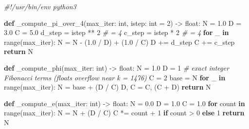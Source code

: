 \documentclass[
  11pt,
  letterpaper,
]{article}
\newenvironment{Shaded}{}{}
\newcommand{\BuiltInTok}[1]{\textcolor[rgb]{0.00,0.50,0.00}{#1}}
\newcommand{\CommentTok}[1]{\textcolor[rgb]{0.38,0.63,0.69}{\textit{#1}}}
\newcommand{\ControlFlowTok}[1]{\textcolor[rgb]{0.00,0.44,0.13}{\textbf{#1}}}
\newcommand{\DecValTok}[1]{\textcolor[rgb]{0.25,0.63,0.44}{#1}}
\newcommand{\FloatTok}[1]{\textcolor[rgb]{0.25,0.63,0.44}{#1}}
\newcommand{\KeywordTok}[1]{\textcolor[rgb]{0.00,0.44,0.13}{\textbf{#1}}}
\newcommand{\NormalTok}[1]{#1}
\newcommand{\OperatorTok}[1]{\textcolor[rgb]{0.40,0.40,0.40}{#1}}
\begin{document}
\begin{Shaded}
\begin{Highlighting}[]
\CommentTok{\#!/usr/bin/env python3}

\KeywordTok{def}\NormalTok{ \_compute\_pi\_over\_4(max\_iter: }\BuiltInTok{int}\NormalTok{, istep: }\BuiltInTok{int} \OperatorTok{=} \DecValTok{2}\NormalTok{) }\OperatorTok{{-}\textgreater{}} \BuiltInTok{float}\NormalTok{:}
\NormalTok{    N }\OperatorTok{=} \FloatTok{1.0}
\NormalTok{    D }\OperatorTok{=} \FloatTok{3.0}
\NormalTok{    C }\OperatorTok{=} \FloatTok{5.0}
\NormalTok{    d\_step }\OperatorTok{=}\NormalTok{ istep }\OperatorTok{**} \DecValTok{2}      \CommentTok{\# = 4}
\NormalTok{    c\_step }\OperatorTok{=}\NormalTok{ istep }\OperatorTok{*} \DecValTok{2}       \CommentTok{\# = 4}
    \ControlFlowTok{for}\NormalTok{ \_ }\KeywordTok{in} \BuiltInTok{range}\NormalTok{(max\_iter):}
\NormalTok{        N }\OperatorTok{=}\NormalTok{ N }\OperatorTok{{-}}\NormalTok{ (}\FloatTok{1.0} \OperatorTok{/}\NormalTok{ D) }\OperatorTok{+}\NormalTok{ (}\FloatTok{1.0} \OperatorTok{/}\NormalTok{ C)}
\NormalTok{        D }\OperatorTok{+=}\NormalTok{ d\_step}
\NormalTok{        C }\OperatorTok{+=}\NormalTok{ c\_step}
    \ControlFlowTok{return}\NormalTok{ N}


\KeywordTok{def}\NormalTok{ \_compute\_phi(max\_iter: }\BuiltInTok{int}\NormalTok{) }\OperatorTok{{-}\textgreater{}} \BuiltInTok{float}\NormalTok{:}
\NormalTok{    N }\OperatorTok{=} \FloatTok{1.0}
\NormalTok{    D }\OperatorTok{=} \DecValTok{1}   \CommentTok{\# exact integer Fibonacci terms (floats overflow near k = 1476)}
\NormalTok{    C }\OperatorTok{=} \DecValTok{2}
\NormalTok{    base }\OperatorTok{=}\NormalTok{ N}
    \ControlFlowTok{for}\NormalTok{ \_ }\KeywordTok{in} \BuiltInTok{range}\NormalTok{(max\_iter):}
\NormalTok{        N }\OperatorTok{=}\NormalTok{ base }\OperatorTok{+}\NormalTok{ (D }\OperatorTok{/}\NormalTok{ C)}
\NormalTok{        D, C }\OperatorTok{=}\NormalTok{ C, (C }\OperatorTok{+}\NormalTok{ D)}
    \ControlFlowTok{return}\NormalTok{ N}


\KeywordTok{def}\NormalTok{ \_compute\_e(max\_iter: }\BuiltInTok{int}\NormalTok{) }\OperatorTok{{-}\textgreater{}} \BuiltInTok{float}\NormalTok{:}
\NormalTok{    N }\OperatorTok{=} \FloatTok{0.0}
\NormalTok{    D }\OperatorTok{=} \FloatTok{1.0}
\NormalTok{    C }\OperatorTok{=} \FloatTok{1.0}
    \ControlFlowTok{for}\NormalTok{ count }\KeywordTok{in} \BuiltInTok{range}\NormalTok{(max\_iter):}
\NormalTok{        N }\OperatorTok{=}\NormalTok{ N }\OperatorTok{+}\NormalTok{ (D }\OperatorTok{/}\NormalTok{ C)}
\NormalTok{        C }\OperatorTok{*=}\NormalTok{ count }\OperatorTok{+} \DecValTok{1} \ControlFlowTok{if}\NormalTok{ count }\OperatorTok{\textgreater{}} \DecValTok{0} \ControlFlowTok{else} \DecValTok{1}
    \ControlFlowTok{return}\NormalTok{ N}



\end{Highlighting}
\end{Shaded}
\end{document}
